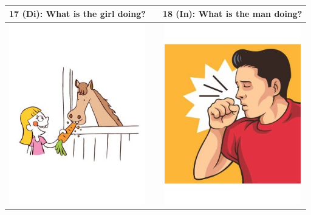 \documentclass[12pt,notitlepage]{article}
\begin{document}
\begin{center}
\begin{tabular}{|c|c|c|}
\hline
17 (Di): What is the girl doing? && 18 (In): What is the man doing? \\
\hline
\includegraphics[width=16em,trim=0 0 0 -3]{figures/I17.jpg} & & \includegraphics[width=16em,trim=0 0 0 -3]{figures/I18.jpg} \\
\hline
\end{tabular}
\vspace{1em} \\



\end{center}
\end{document}
